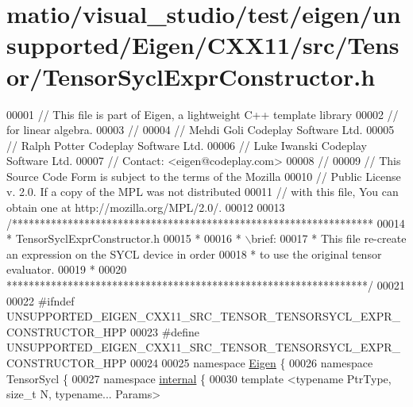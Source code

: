 \hypertarget{matio_2visual__studio_2test_2eigen_2unsupported_2_eigen_2_c_x_x11_2src_2_tensor_2_tensor_sycl_expr_constructor_8h_source}{}\section{matio/visual\+\_\+studio/test/eigen/unsupported/\+Eigen/\+C\+X\+X11/src/\+Tensor/\+Tensor\+Sycl\+Expr\+Constructor.h}
\label{matio_2visual__studio_2test_2eigen_2unsupported_2_eigen_2_c_x_x11_2src_2_tensor_2_tensor_sycl_expr_constructor_8h_source}

\begin{DoxyCode}
00001 \textcolor{comment}{// This file is part of Eigen, a lightweight C++ template library}
00002 \textcolor{comment}{// for linear algebra.}
00003 \textcolor{comment}{//}
00004 \textcolor{comment}{// Mehdi Goli    Codeplay Software Ltd.}
00005 \textcolor{comment}{// Ralph Potter  Codeplay Software Ltd.}
00006 \textcolor{comment}{// Luke Iwanski  Codeplay Software Ltd.}
00007 \textcolor{comment}{// Contact: <eigen@codeplay.com>}
00008 \textcolor{comment}{//}
00009 \textcolor{comment}{// This Source Code Form is subject to the terms of the Mozilla}
00010 \textcolor{comment}{// Public License v. 2.0. If a copy of the MPL was not distributed}
00011 \textcolor{comment}{// with this file, You can obtain one at http://mozilla.org/MPL/2.0/.}
00012 
00013 \textcolor{comment}{/*****************************************************************}
00014 \textcolor{comment}{ * TensorSyclExprConstructor.h}
00015 \textcolor{comment}{ *}
00016 \textcolor{comment}{ * \(\backslash\)brief:}
00017 \textcolor{comment}{ *  This file re-create an expression on the SYCL device in order}
00018 \textcolor{comment}{ *  to use the original tensor evaluator.}
00019 \textcolor{comment}{ *}
00020 \textcolor{comment}{*****************************************************************/}
00021 
00022 \textcolor{preprocessor}{#ifndef UNSUPPORTED\_EIGEN\_CXX11\_SRC\_TENSOR\_TENSORSYCL\_EXPR\_CONSTRUCTOR\_HPP}
00023 \textcolor{preprocessor}{#define UNSUPPORTED\_EIGEN\_CXX11\_SRC\_TENSOR\_TENSORSYCL\_EXPR\_CONSTRUCTOR\_HPP}
00024 
00025 \textcolor{keyword}{namespace }\hyperlink{namespace_eigen}{Eigen} \{
00026 \textcolor{keyword}{namespace }TensorSycl \{
00027 \textcolor{keyword}{namespace }\hyperlink{namespaceinternal}{internal} \{
00030 \textcolor{keyword}{template} <\textcolor{keyword}{typename} PtrType, \textcolor{keywordtype}{size\_t} N, \textcolor{keyword}{typename}... Params>

\end{DoxyCode}
